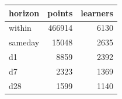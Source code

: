 \begin{tabular}{lrr}
\toprule
horizon & points & learners \\
\midrule
within & 466914 & 6130 \\
sameday & 15048 & 2635 \\
d1 & 8859 & 2392 \\
d7 & 2323 & 1369 \\
d28 & 1599 & 1140 \\
\bottomrule
\end{tabular}
